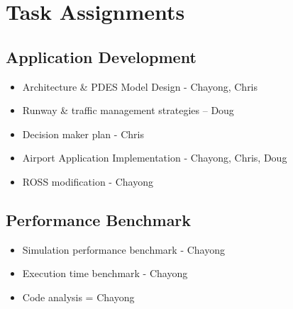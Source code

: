 \section {Task Assignments}
\subsection{Application Development}

\begin{itemize}
\renewcommand{\labelitemi}{$\bullet$}
\item Architecture \& PDES Model Design - Chayong, Chris
\item Runway \& traffic management strategies – Doug
\item Decision maker plan - Chris
\item Airport Application Implementation - Chayong, Chris, Doug
\item ROSS modification - Chayong
\end{itemize}

\subsection{Performance Benchmark}

\begin{itemize}
\renewcommand{\labelitemi}{$\bullet$}
\item Simulation performance benchmark - Chayong
\item Execution time benchmark - Chayong
\item Code analysis = Chayong
\end{itemize}